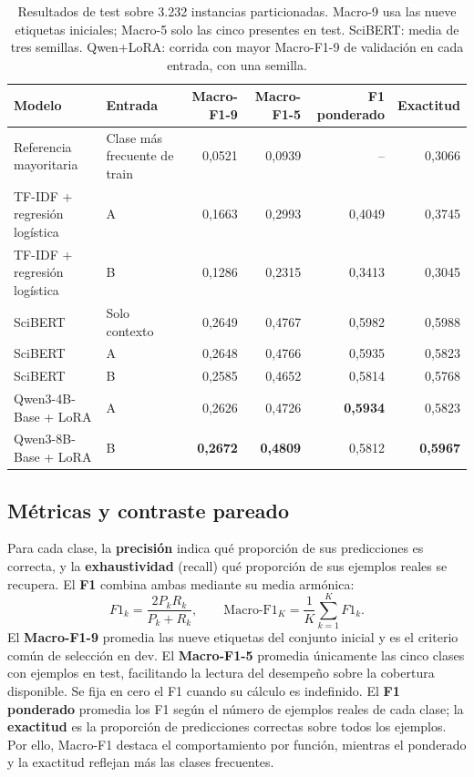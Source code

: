 \documentclass[10pt,a4paper,twocolumn]{article}
\begin{document}
\begin{table}[t]
\centering\small
\caption{Resultados de test sobre 3.232 instancias particionadas. Macro-9 usa las nueve etiquetas iniciales; Macro-5 solo las cinco presentes en test. SciBERT: media de tres semillas. Qwen+LoRA: corrida con mayor Macro-F1-9 de validación en cada entrada, con una semilla.}\label{tab:results}
\begin{tabular}{llrrrr}\toprule
Modelo & Entrada & Macro-F1-9 & Macro-F1-5 & F1 ponderado & Exactitud\\\midrule
Referencia mayoritaria & Clase más frecuente de train & 0,0521 & 0,0939 & -- & 0,3066\\
TF-IDF + regresión logística & A & 0,1663 & 0,2993 & 0,4049 & 0,3745\\
TF-IDF + regresión logística & B & 0,1286 & 0,2315 & 0,3413 & 0,3045\\\midrule
SciBERT & Solo contexto & 0,2649 & 0,4767 & 0,5982 & 0,5988\\
SciBERT & A & 0,2648 & 0,4766 & 0,5935 & 0,5823\\
SciBERT & B & 0,2585 & 0,4652 & 0,5814 & 0,5768\\\midrule
Qwen3-4B-Base + LoRA & A & 0,2626 & 0,4726 & \textbf{0,5934} & 0,5823\\
Qwen3-8B-Base + LoRA & B & \textbf{0,2672} & \textbf{0,4809} & 0,5812 & \textbf{0,5967}\\\bottomrule
\end{tabular}
\end{table}

\subsection{Métricas y contraste pareado}
Para cada clase, la \textbf{precisión} indica qué proporción de sus predicciones es correcta, y la \textbf{exhaustividad} (recall) qué proporción de sus ejemplos reales se recupera. El \textbf{F1} combina ambas mediante su media armónica:
\[
 F1_k=\frac{2P_kR_k}{P_k+R_k},\qquad
 \mathrm{Macro\text{-}F1}_{K}=\frac{1}{K}\sum_{k=1}^{K}F1_k.
\]
El \textbf{Macro-F1-9} promedia las nueve etiquetas del conjunto inicial y es el criterio común de selección en dev. El \textbf{Macro-F1-5} promedia únicamente las cinco clases con ejemplos en test, facilitando la lectura del desempeño sobre la cobertura disponible. Se fija en cero el F1 cuando su cálculo es indefinido. El \textbf{F1 ponderado} promedia los F1 según el número de ejemplos reales de cada clase; la \textbf{exactitud} es la proporción de predicciones correctas sobre todos los ejemplos. Por ello, Macro-F1 destaca el comportamiento por función, mientras el ponderado y la exactitud reflejan más las clases frecuentes.
\end{document}

